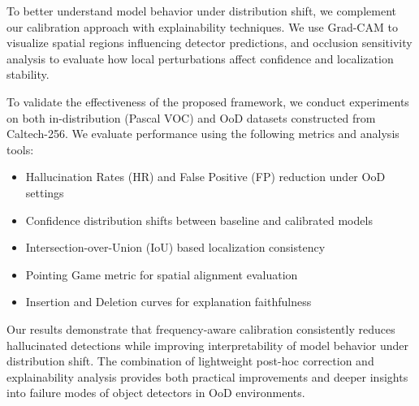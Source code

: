 To better understand model behavior under distribution shift, we complement our calibration approach with explainability techniques. We use Grad-CAM to visualize spatial regions influencing detector predictions, and occlusion sensitivity analysis to evaluate how local perturbations affect confidence and localization stability.

To validate the effectiveness of the proposed framework, we conduct experiments on both in-distribution (Pascal VOC) and OoD datasets constructed from Caltech-256. We evaluate performance using the following metrics and analysis tools:

\begin{itemize}
    \item Hallucination Rates (HR) and False Positive (FP) reduction under OoD settings
    \item Confidence distribution shifts between baseline and calibrated models
    \item Intersection-over-Union (IoU) based localization consistency
    \item Pointing Game metric for spatial alignment evaluation
    \item Insertion and Deletion curves for explanation faithfulness
\end{itemize}

Our results demonstrate that frequency-aware calibration consistently reduces hallucinated detections while improving interpretability of model behavior under distribution shift. The combination of lightweight post-hoc correction and explainability analysis provides both practical improvements and deeper insights into failure modes of object detectors in OoD environments.